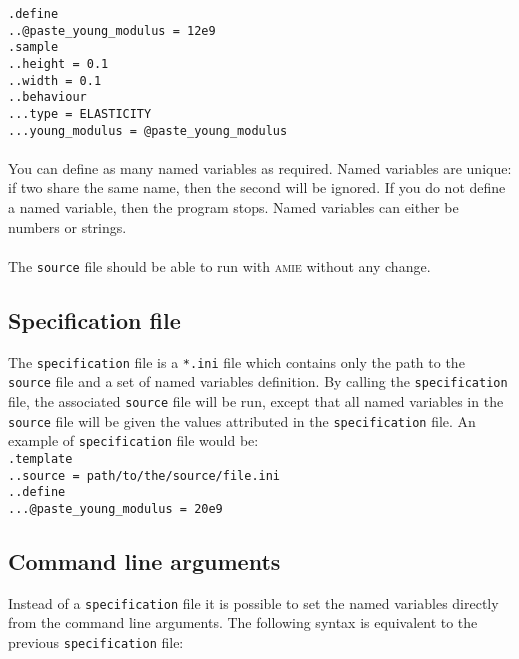 \documentclass[10pt]{article}
\begin{document}
\noindent \verb+.define+\\
\verb+..@paste_young_modulus = 12e9+\\
\verb+.sample+\\
\verb+..height = 0.1+\\
\verb+..width = 0.1+\\
\verb+..behaviour+\\
\verb+...type = ELASTICITY+\\
\verb+...young_modulus = @paste_young_modulus+

\paragraph{} You can define as many named variables as required. Named variables are unique: if two share the same name, then the second will be ignored. If you do not define a named variable, then the program stops. Named variables can either be numbers or strings. 

\paragraph{} The \verb+source+ file should be able to run with \textsc{amie} without any change.

\subsection{Specification file}

The \verb+specification+ file is a \verb+*.ini+ file which contains only the path to the \verb+source+ file and a set of named variables definition. By calling the \verb+specification+ file, the associated \verb+source+ file will be run, except that all named variables in the \verb+source+ file will be given the values attributed in the \verb+specification+ file. An example of \verb+specification+ file would be:\\

\noindent \verb+.template+\\
\verb+..source = path/to/the/source/file.ini+\\
\verb+..define+\\
\verb+...@paste_young_modulus = 20e9+

\subsection{Command line arguments}

Instead of a \verb+specification+ file it is possible to set the named variables directly from the command line arguments. The following syntax is equivalent to the previous \verb+specification+ file:\\
\end{document}
